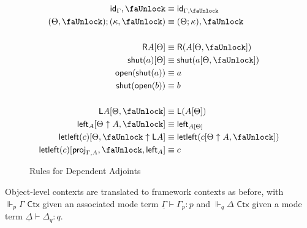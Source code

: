 \documentclass[10pt]{article}
\theoremstyle{definition}
\newcommand{\yields}{\vdash}
\newcommand{\CTX}{\,\,\mathsf{Ctx}}
\newcommand{\TYPE}{\,\,\mathsf{Type}}
\newcommand{\id}{\mathsf{id}}
\newcommand{\modeof}[1]{{#1}_p}
\newcommand{\modeofq}[1]{{#1}_q}
\newcommand{\qyields}{\Vdash}
\newcommand{\downstairs}[1]{\underline{#1}}
\newcommand\proj[1]{\ensuremath{\mathsf{proj}_{#1}}}
\newcommand{\lock}{\text{\faUnlock}}
\newcommand{\Rtype}[1]{\mathsf{R}{#1}}
\newcommand{\RI}[1]{\mathsf{shut}({#1})}
\newcommand{\RE}[1]{\mathsf{open}({#1})}
\newcommand{\Ltype}[1]{\mathsf{L}{#1}}
\newcommand{\LI}[1]{\mathsf{left}_{#1}}
\newcommand{\LE}[1]{\mathsf{letleft}({#1})}
\begin{document}
\begin{figure}
\begin{align}
\id_\Gamma , \lock &\equiv \id_{\Gamma, \lock} \\
(\Theta, \lock) ; (\kappa, \lock) &\equiv (\Theta ; \kappa), \lock \\
\nonumber \\
\Rtype{A}[\Theta] &\equiv \Rtype{(A[\Theta, \lock])} \\
\RI{a}[\Theta] &\equiv \RI{a[\Theta, \lock]} \\
\RE{\RI{a}} &\equiv a \\
\RI{\RE{b}} &\equiv b \\
\nonumber \\
\Ltype{A}[\Theta, \lock] &\equiv \Ltype{(A[\Theta])} \\
\LI{A}[\Theta \uparrow A, \lock] &\equiv \LI{A[\Theta]} \\
\LE{c}[\Theta, \lock \uparrow \Ltype{A}] &\equiv \LE{c[\Theta \uparrow A, \lock]} \\
\LE{c}[\proj{\Gamma, A}, \lock, \LI{A}] &\equiv c
\end{align}
\caption{Rules for Dependent Adjoints}\label{fig:qit-adjoint-rules}
\end{figure}

Object-level contexts are translated to framework contexts as before,
with $\qyields_p \Gamma \CTX$ given an associated mode term
$\downstairs{\Gamma} \yields \modeof{\Gamma} : p$ and
$\qyields_q \Delta \CTX$ given a mode term $\downstairs{\Delta} \yields \modeofq{\Delta} : q$.
\end{document}
